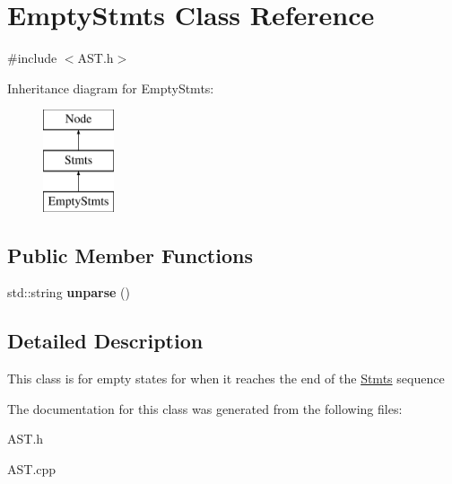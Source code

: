 \hypertarget{classEmptyStmts}{\section{Empty\-Stmts Class Reference}
\label{classEmptyStmts}
}


{\ttfamily \#include $<$A\-S\-T.\-h$>$}

Inheritance diagram for Empty\-Stmts\-:\begin{figure}[H]
\begin{center}
\leavevmode
\includegraphics[height=3.000000cm]{classEmptyStmts}
\end{center}
\end{figure}
\subsection*{Public Member Functions}
\begin{DoxyCompactItemize}
\item 
\hypertarget{classEmptyStmts_a127064ef5c59227fc8452b31c65eb905}{std\-::string {\bfseries unparse} ()}\label{classEmptyStmts_a127064ef5c59227fc8452b31c65eb905}

\end{DoxyCompactItemize}


\subsection{Detailed Description}
This class is for empty states for when it reaches the end of the \hyperlink{classStmts}{Stmts} sequence 

The documentation for this class was generated from the following files\-:\begin{DoxyCompactItemize}
\item 
A\-S\-T.\-h\item 
A\-S\-T.\-cpp\end{DoxyCompactItemize}
